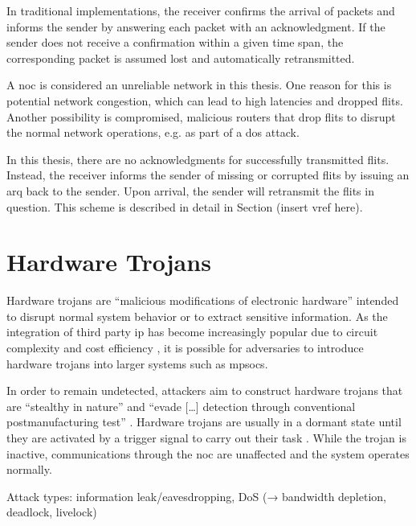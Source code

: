 In traditional implementations, the receiver confirms the arrival of packets and informs the sender by answering each packet with an acknowledgment.
If the sender does not receive a confirmation within a given time span, the corresponding packet is assumed lost and automatically retransmitted.

A \gls{noc} is considered an unreliable network in this thesis. One reason for this is potential network congestion, which can lead to high latencies
and dropped flits. Another possibility is compromised, malicious routers that drop flits to disrupt the normal network operations, e.g. as part of a
\gls{dos} attack.

In this thesis, there are no acknowledgments for successfully transmitted flits. Instead, the receiver informs the sender of missing or corrupted
flits by issuing an \gls{arq} back to the sender. Upon arrival, the sender will retransmit the flits in question. This scheme is described in detail
in Section (insert vref here).

\section{Hardware Trojans}\label{sec:hardwaretrojans}
Hardware trojans are \enquote{malicious modifications of electronic hardware} \cite[1]{bhunia14hardwaretrojans} intended to disrupt normal
system behavior or to extract sensitive information. As the integration of third party \gls{ip} has become increasingly popular due to circuit
complexity and cost efficiency \cites[1]{ancajas14fortnocs}[2]{bhunia14hardwaretrojans}, it is possible for adversaries to introduce hardware
trojans into larger systems such as \glspl{mpsoc}.

In order to remain undetected, attackers aim to construct hardware trojans that are \enquote{stealthy in nature} \cite[1]{bhunia14hardwaretrojans}
and \enquote{evade […] detection through conventional postmanufacturing test} \cite[1]{bhunia14hardwaretrojans}. Hardware trojans are usually in a
dormant state until they are activated by a trigger signal to carry out their task \cites{bhunia14hardwaretrojans}{ancajas14fortnocs}. While the
trojan is inactive, communications through the \gls{noc} are unaffected and the system operates normally.

Attack types: information leak/eavesdropping, DoS (→ bandwidth depletion, deadlock, livelock)

